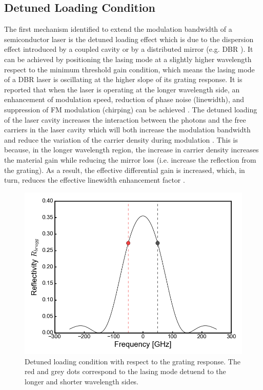 \subsection{Detuned Loading Condition}\label{subsec:detuned_loading}
The first mechanism identified to extend the modulation bandwidth of a semiconductor laser is the detuned loading effect which is due to the dispersion effect introduced by a coupled cavity \cite{vahala1984detuned, vahala1985observation} or by a distributed mirror (e.g. DBR \cite{feiste1998optimization, kjebon1997two, chacinski2010impact}). It can be achieved by positioning the lasing mode at a slightly higher wavelength respect to the minimum threshold gain condition, which means the lasing mode of a DBR laser is oscillating at the higher slope of its grating response. It is reported that when the laser is operating at the longer wavelength side, an enhancement of modulation speed, reduction of phase noise (linewidth), and suppression of FM modulation (chirping) can be achieved \cite{vahala1984detuned}. The detuned loading of the laser cavity increases the interaction between the photons and the free carriers in the laser cavity which will both increase the modulation bandwidth and reduce the variation of the carrier density during modulation \cite{kjebon2002experimental}. This is because, in the longer wavelength region, the increase in carrier density increases the material gain while reducing the mirror loss (i.e. increase the reflection from the grating). As a result, the effective differential gain is increased, which, in turn, reduces the effective linewidth enhancement factor \cite{vahala1984detuned, chacinski2010impact}.

\begin{figure}[ht]
    \centering
    \includegraphics[width=.7\linewidth]{figures/detuned_loading_principle.png}
    \caption{Detuned loading condition with respect to the grating response. The red and grey dots correspond to the lasing mode detuend to the longer and shorter wavelength sides.}
    \label{fig:detuned_loading_principle}
\end{figure}


